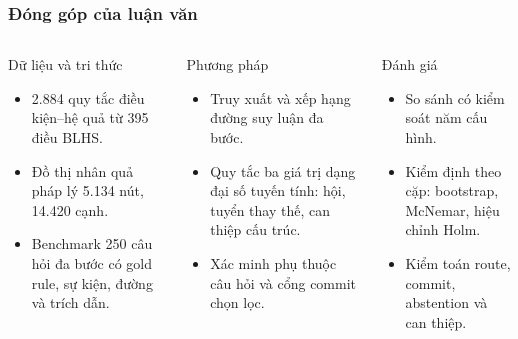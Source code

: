 \begin{frame}
\frametitle{Đóng góp của luận văn}
\begin{columns}[T,onlytextwidth]
\begin{block}{Dữ liệu và tri thức}
\footnotesize
\begin{itemize}
  \item 2.884 quy tắc điều kiện--hệ quả từ 395 điều BLHS.
  \item Đồ thị nhân quả pháp lý 5.134 nút, 14.420 cạnh.
  \item Benchmark 250 câu hỏi đa bước có gold rule, sự kiện, đường và trích dẫn.
\end{itemize}
\end{block}
\begin{block}{Phương pháp}
\footnotesize
\begin{itemize}
  \item Truy xuất và xếp hạng đường suy luận đa bước.
  \item Quy tắc ba giá trị dạng đại số tuyến tính: hội, tuyển thay thế, can thiệp cấu trúc.
  \item Xác minh phụ thuộc câu hỏi và cổng commit chọn lọc.
\end{itemize}
\end{block}
\begin{block}{Đánh giá}
\footnotesize
\begin{itemize}
  \item So sánh có kiểm soát năm cấu hình.
  \item Kiểm định theo cặp: bootstrap, McNemar, hiệu chỉnh Holm.
  \item Kiểm toán route, commit, abstention và can thiệp.
\end{itemize}
\end{block}
\end{columns}

\vspace{0.35cm}
\begin{center}
\hfill
{}\hfill
{}\hfill
{}
\end{center}
\end{frame}
